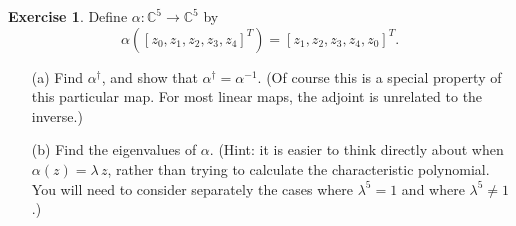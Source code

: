 \documentclass{amsart}
\newcommand{\C}         {{\mathbb{C}}}
\newcommand{\al}        {\alpha}
\newcommand{\lm}        {\lambda}
\renewcommand{\:}       {\colon}
\theoremstyle{definition}
\newtheorem{exercise}{Exercise}[section]
\begin{document}
\begin{exercise}
 Define $\al\:\C^5\to\C^5$ by 
 \[ \al([z_0,z_1,z_2,z_3,z_4]^T) = [z_1,z_2,z_3,z_4,z_0]^T. \]
 \begin{itemize}
  \item[(a)] Find $\al^\dag$, and show that $\al^\dag=\al^{-1}$.
   (Of course this is a special property of this particular map.  For
   most linear maps, the adjoint is unrelated to the inverse.)
  \item[(b)] Find the eigenvalues of $\al$.  (Hint: it is easier to
   think directly about when $\al(z)=\lm\,z$, rather than trying to
   calculate the characteristic polynomial.  You will need to consider
   separately the cases where $\lm^5=1$ and where $\lm^5\neq 1$.)
 \end{itemize}
\end{exercise}
\end{document}
